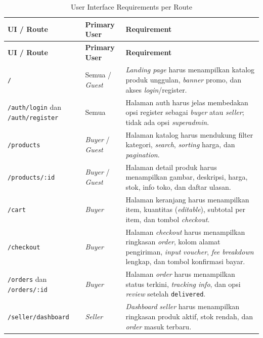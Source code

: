 \begin{longtable}{|L{4cm}|L{2.5cm}|L{8cm}|}
    \caption{User Interface Requirements per Route}
    \label{tab:ui-req} \\
    \hline
    \textbf{UI / Route} & \textbf{Primary User} & \textbf{Requirement} \\
    \hline
    \endfirsthead
    \hline
    \textbf{UI / Route} & \textbf{Primary User} & \textbf{Requirement} \\
    \hline
    \endhead
    \hline
    \endfoot
    \texttt{/}
        & Semua / \textit{Guest}
        & \textit{Landing page} harus menampilkan katalog produk unggulan,
          \textit{banner} promo, dan akses \textit{login}/register. \\
    \hline
    \texttt{/auth/login} dan \texttt{/auth/register}
        & Semua
        & Halaman auth harus jelas membedakan opsi register sebagai \textit{buyer}
          atau \textit{seller}; tidak ada opsi \textit{superadmin}. \\
    \hline
    \texttt{/products}
        & \textit{Buyer} / \textit{Guest}
        & Halaman katalog harus mendukung filter kategori, \textit{search},
          \textit{sorting} harga, dan \textit{pagination}. \\
    \hline
    \texttt{/products/:id}
        & \textit{Buyer} / \textit{Guest}
        & Halaman detail produk harus menampilkan gambar, deskripsi, harga, stok,
          info toko, dan daftar ulasan. \\
    \hline
    \texttt{/cart}
        & \textit{Buyer}
        & Halaman keranjang harus menampilkan item, kuantitas (\textit{editable}),
          subtotal per item, dan tombol \textit{checkout}. \\
    \hline
    \texttt{/checkout}
        & \textit{Buyer}
        & Halaman \textit{checkout} harus menampilkan ringkasan \textit{order},
          kolom alamat pengiriman, \textit{input} \textit{voucher},
          \textit{fee breakdown} lengkap, dan tombol konfirmasi bayar. \\
    \hline
    \texttt{/orders} dan \texttt{/orders/:id}
        & \textit{Buyer}
        & Halaman \textit{order} harus menampilkan status terkini,
          \textit{tracking info}, dan opsi \textit{review} setelah
          \texttt{delivered}. \\
    \hline
    \texttt{/seller/dashboard}
        & \textit{Seller}
        & \textit{Dashboard} \textit{seller} harus menampilkan ringkasan produk
          aktif, stok rendah, dan \textit{order} masuk terbaru. \\

\end{longtable}
